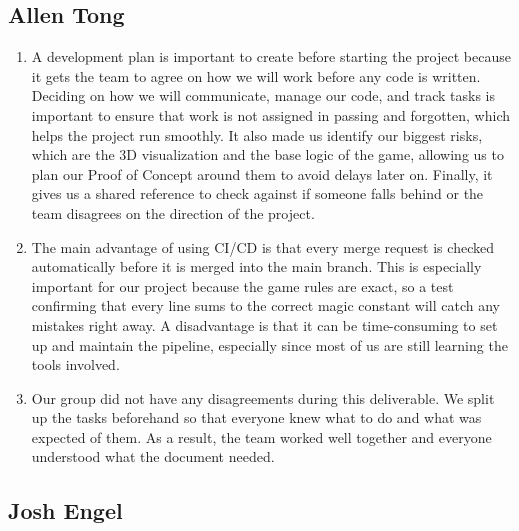 \documentclass{article}
\begin{document}
\subsection*{Allen Tong}

\begin{enumerate}
  \item A development plan is important to create before starting the project because it gets the team to agree on how we will work before any code is written. Deciding on how we will communicate, manage our code, and track tasks is important to ensure that work is not assigned in passing and forgotten, which helps the project run smoothly. It also made us identify our biggest risks, which are the 3D visualization and the base logic of the game, allowing us to plan our Proof of Concept around them to avoid delays later on. Finally, it gives us a shared reference to check against if someone falls behind or the team disagrees on the direction of the project.
  \item The main advantage of using CI/CD is that every merge request is checked automatically before it is merged into the main branch. This is especially important for our project because the game rules are exact, so a test confirming that every line sums to the correct magic constant will catch any mistakes right away. A disadvantage is that it can be time-consuming to set up and maintain the pipeline, especially since most of us are still learning the tools involved.
  \item Our group did not have any disagreements during this deliverable. We split up the tasks beforehand so that everyone knew what to do and what was expected of them. As a result, the team worked well together and everyone understood what the document needed.
\end{enumerate}

\subsection*{Josh Engel}
\end{document}
